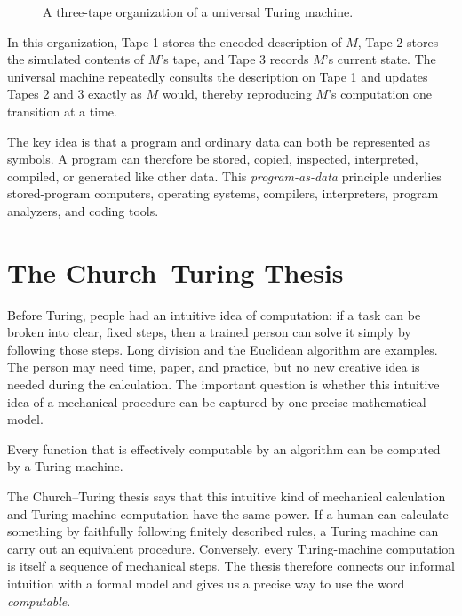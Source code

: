 \documentclass[11pt]{article}
\begin{document}
\begin{figure}[htbp]
  \centering
  
  \caption{A three-tape organization of a universal Turing machine.}
  \label{fig:three-tape-universal-turing-machine}
\end{figure}

In this organization, Tape 1 stores the encoded description of $M$, Tape 2
stores the simulated contents of $M$'s tape, and Tape 3 records $M$'s current
state. The universal machine repeatedly consults the description on Tape 1 and
updates Tapes 2 and 3 exactly as $M$ would, thereby reproducing $M$'s computation
one transition at a time.

The key idea is that a program and ordinary data can both be represented as symbols. A program can therefore be stored, copied, inspected, interpreted, compiled, or generated like other data. This \emph{program-as-data} principle underlies stored-program computers, operating systems, compilers, interpreters, program analyzers, and coding tools.

\section{The Church--Turing Thesis}

Before Turing, people had an intuitive idea of computation: if a task can be
broken into clear, fixed steps, then a trained person can solve it simply by
following those steps. Long division and the Euclidean algorithm are examples.
The person may need time, paper, and practice, but no new creative idea is needed
during the calculation. The important question is whether this intuitive idea
of a mechanical procedure can be captured by one precise mathematical model.

\begin{keyidea}
Every function that is effectively computable by an algorithm can be computed by a Turing machine.
\end{keyidea}

The Church--Turing thesis says that this intuitive kind of mechanical
calculation and Turing-machine computation have the same power. If a human can
calculate something by faithfully following finitely described rules, a Turing
machine can carry out an equivalent procedure. Conversely, every Turing-machine
computation is itself a sequence of mechanical steps. The thesis therefore
connects our informal intuition with a formal model and gives us a precise way
to use the word \emph{computable}.
\end{document}
